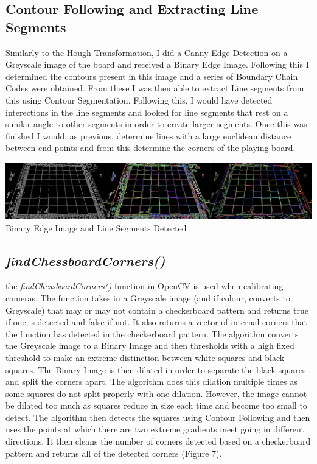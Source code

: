 \documentclass[11pt]{article}
\begin{document}
    \newpage
    \subsection{Contour Following and Extracting Line Segments}
    \par
    Similarly to the Hough Transformation, I did a Canny Edge Detection on a Greyscale image of the board and received a Binary Edge Image. Following this I determined the contours present in this image and a series of Boundary Chain Codes were obtained. From these I was then able to 
    extract Line segments from this using Contour Segmentation. Following this, I would have detected interections in the line segments and looked for line segments that rest on a similar angle to other segments in order to create larger segments. Once this was finished I would, as previous,
    determine lines with a large euclidean distance between end points and from this determine the corners of the playing board.
    \begin{center}
        \includegraphics[scale=0.3]{LineSegments.png}
        Binary Edge Image and Line Segments Detected
    \end{center}

    \subsection{\emph{findChessboardCorners()}}
    \par
    the \emph{findChessboardCorners()} function in OpenCV is used when calibrating cameras. The function takes in a Greyscale image (and if colour, converts to Greyscale) that may or may not contain a checkerboard pattern and returns true if one is detected and false if not. It also returns a vector of internal corners that the 
    function has detected in the checkerboard pattern. The algorithm converts the Greyscale image to a Binary Image and then thresholds with a high fixed threshold to make an extreme distinction between white squares and black squares. The Binary Image is then dilated in order to separate the black squares and split the corners apart.
    The algorithm does this dilation multiple times as some squares do not split properly with one dilation. However, the image cannot be dilated too much as squares reduce in size each time and become too small to detect. The algorithm then detects the squares using Contour Following and then uses the points at which there are 
    two extreme gradients meet going in different directions. It then cleans the number of corners detected based on a checkerboard pattern and returns all of the detected corners (Figure 7).
    
\end{document}

